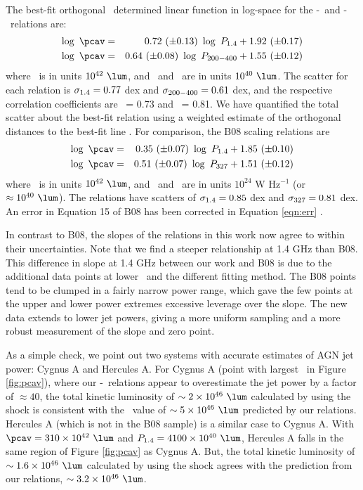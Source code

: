 \documentclass{emulateapj}
\begin{document}
The best-fit orthogonal \bces\ determined linear function in log-space
for the \pcav-\phigh\ and \pcav-\plow\ relations are:
\begin{eqnarray}
  \log~\pcav &=& 0.72~(\pm 0.13)~\log~\phigh + 1.92~(\pm 0.17) \label{eqn:high}\\
  \log~\pcav &=& 0.64~(\pm 0.08)~\log~\plow + 1.55~(\pm 0.12) \label{eqn:low}
\end{eqnarray}
where \pcav\ is in units $10^{42} ~\lum$, and \phigh\ and \plow\ are
in units $10^{40} ~\lum$. The scatter for each relation is $\sigma_{\mathrm{1.4}} =
0.77$ dex and $\sigma_{\mathrm{200-400}} = 0.61$ dex, and the respective correlation
coefficients are \rhigh\ = 0.73 and \rlow\ = 0.81. We have quantified
the total scatter about the best-fit relation using a weighted
estimate of the orthogonal distances to the best-fit line
\citep[see][]{2009A&A...498..361P}. For comparison, the B08 scaling
relations are
\begin{eqnarray}
  \log~\pcav &=& 0.35~(\pm 0.07)~\log~\phigh + 1.85~(\pm 0.10) \\
  \log~\pcav &=& 0.51~(\pm 0.07)~\log~\pthree + 1.51~(\pm 0.12) \label{eqn:err}
\end{eqnarray}
where \pcav\ is in units $10^{42} ~\lum$, and \phigh\ and \pthree\ are
in units $10^{24}$ W Hz$^{-1}$ (or $\approx 10^{40} ~\lum$). The
relations have scatters of $\sigma_{\mathrm{1.4}} = 0.85$ dex and $\sigma_{\mathrm{327}} = 0.81$
dex. An error in Equation 15 of B08 has been corrected in Equation
\ref{eqn:err} \citep{birzan08err}.

In contrast to B08, the slopes of the relations in this work now agree
to within their uncertainties. Note that we find a steeper
relationship at 1.4 GHz than B08. This difference in slope at 1.4 GHz
between our work and B08 is due to the additional data points at lower
\pjet\ and the different fitting method. The B08 points tend to be
clumped in a fairly narrow power range, which gave the few points at
the upper and lower power extremes excessive leverage over the
slope. The new data extends to lower jet powers, giving a more uniform
sampling and a more robust measurement of the slope and zero point.

As a simple check, we point out two systems with accurate estimates of
AGN jet power: Cygnus A and Hercules A. For Cygnus A (point with
largest \phigh\ in Figure \ref{fig:pcav}), where our
\pjet-\prad\ relations appear to overestimate the jet power by a
factor of $\approx 40$, the total kinetic luminosity of $\sim
2\times10^{46} ~\lum$ calculated by \citet{2006ApJ...644L...9W} using
the shock is consistent with the \pjet\ value of $\sim 5\times10^{46}
~\lum$ predicted by our relations. Hercules A (which is not in the B08
sample) is a similar case to Cygnus A. With $\pcav = 310\times10^{42}
~\lum$ and $\phigh = 4100\times10^{40} ~\lum$, Hercules A falls in the
same region of Figure \ref{fig:pcav} as Cygnus A. But, the total
kinetic luminosity of $\sim 1.6\times10^{46} ~\lum$ calculated by
\citet{herca} using the shock agrees with the prediction from our
relations, $\sim 3.2\times10^{46} ~\lum$.
\end{document}
